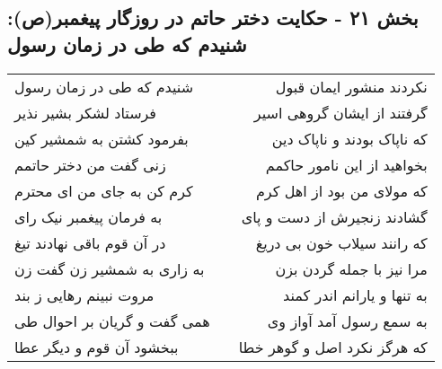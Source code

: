 \begin{center}
\section*{بخش ۲۱ - حکایت دختر حاتم در روزگار پیغمبر(ص): شنیدم که طی در زمان رسول}
\label{sec:021}
\begin{longtable}{l p{0.5cm} r}
شنیدم که طی در زمان رسول
&&
نکردند منشور ایمان قبول
\\
فرستاد لشکر بشیر نذیر
&&
گرفتند از ایشان گروهی اسیر
\\
بفرمود کشتن به شمشیر کین
&&
که ناپاک بودند و ناپاک دین
\\
زنی گفت من دختر حاتمم
&&
بخواهید از این نامور حاکمم
\\
کرم کن به جای من ای محترم
&&
که مولای من بود از اهل کرم
\\
به فرمان پیغمبر نیک رای
&&
گشادند زنجیرش از دست و پای
\\
در آن قوم باقی نهادند تیغ
&&
که رانند سیلاب خون بی دریغ
\\
به زاری به شمشیر زن گفت زن
&&
مرا نیز با جمله گردن بزن
\\
مروت نبینم رهایی ز بند
&&
به تنها و یارانم اندر کمند
\\
همی گفت و گریان بر احوال طی
&&
به سمع رسول آمد آواز وی
\\
ببخشود آن قوم و دیگر عطا
&&
که هرگز نکرد اصل و گوهر خطا
\\
\end{longtable}
\end{center}
